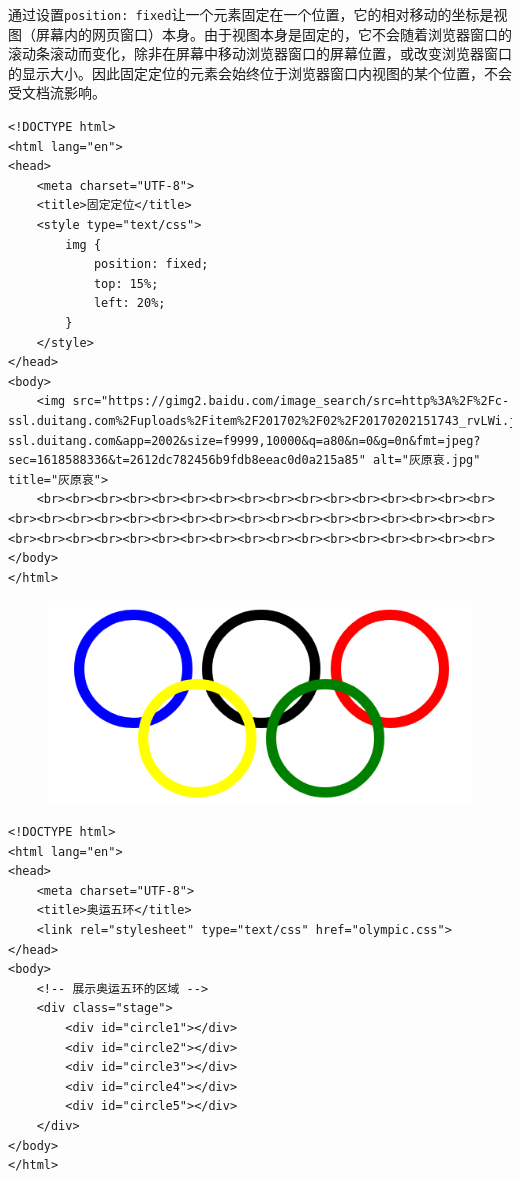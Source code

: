 通过设置\lstinline|position: fixed|让一个元素固定在一个位置，它的相对移动的坐标是视图（屏幕内的网页窗口）本身。由于视图本身是固定的，它不会随着浏览器窗口的滚动条滚动而变化，除非在屏幕中移动浏览器窗口的屏幕位置，或改变浏览器窗口的显示大小。因此固定定位的元素会始终位于浏览器窗口内视图的某个位置，不会受文档流影响。

\begin{lstlisting}[style=htmlcssjs, title=固定定位, breaklines=true, breakatwhitespace=false]
<!DOCTYPE html>
<html lang="en">
<head>
    <meta charset="UTF-8">
    <title>固定定位</title>
    <style type="text/css">
        img {
            position: fixed;
            top: 15%;
            left: 20%;
        }
    </style>
</head>
<body>
    <img src="https://gimg2.baidu.com/image_search/src=http%3A%2F%2Fc-ssl.duitang.com%2Fuploads%2Fitem%2F201702%2F02%2F20170202151743_rvLWi.jpeg&refer=http%3A%2F%2Fc-ssl.duitang.com&app=2002&size=f9999,10000&q=a80&n=0&g=0n&fmt=jpeg?sec=1618588336&t=2612dc782456b9fdb8eeac0d0a215a85" alt="灰原哀.jpg" title="灰原哀">
    <br><br><br><br><br><br><br><br><br><br><br><br><br><br><br><br><br><br><br><br><br><br><br><br><br><br><br><br><br><br><br><br><br><br><br><br><br><br><br><br><br><br><br><br><br><br><br><br><br><br>
</body>
</html>
\end{lstlisting}


\begin{figure}[H]
    \centering
    \includegraphics[scale=0.7]{img/C8/8-4/1.png}
\end{figure}

\begin{lstlisting}[style=htmlcssjs, title=olympic.html]
<!DOCTYPE html>
<html lang="en">
<head>
    <meta charset="UTF-8">
    <title>奥运五环</title>
    <link rel="stylesheet" type="text/css" href="olympic.css">
</head>
<body>
    <!-- 展示奥运五环的区域 -->
    <div class="stage">
        <div id="circle1"></div>
        <div id="circle2"></div>
        <div id="circle3"></div>
        <div id="circle4"></div>
        <div id="circle5"></div>
    </div>
</body>
</html>
\end{lstlisting}

